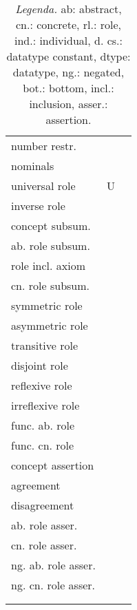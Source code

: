 \documentclass[a4paper]{llncs}
\newcommand{\sroiqd}{\ensuremath{\mathcal{SROIQ}(\D)}}
\newcommand{\D}{\mathbf{D}}
\begin{document}
{\begin{longtable}{|>{\centering}m{2.5cm}|c|>{\centering\arraybackslash}m{7.5cm}|}
number restr.&  &  \\

nominals & &  \\

\hline

universal role & U & \\

inverse role &  & \\

\hline

concept subsum. &  &  \\

ab. role subsum. &  & \\

role incl. axiom &  & \\
cn. role subsum. &  & \\

\hline

symmetric role &  & \\

asymmetric role &  & \\

transitive role &  & \\

disjoint role &  & \\

reflexive role & & \\

irreflexive role & & \\

func. ab. role &  &   \\

func. cn. role &  &   \\

\hline

concept assertion &  &  \\

agreement &  & \\

disagreement &  & \\



ab. role asser. &  &  \\

cn. role asser. &  &  \\

ng. ab. role asser. &  &  \\

ng. cn. role asser. &  &   \\










\hline \caption{Semantics of \sroiqd.}\\
\caption*{\emph{Legenda.} ab: abstract, cn.: concrete, rl.: role, ind.: individual, d. cs.: datatype constant, dtype: datatype, ng.: negated, bot.: bottom, incl.: inclusion, asser.: assertion.}  \label{semsroiq}
\end{longtable}}
\end{document}
